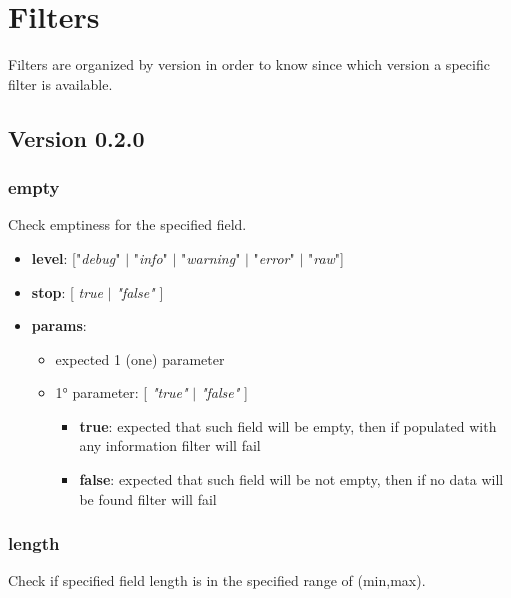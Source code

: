 \documentclass[12pt, a4paper]{book}
\begin{document}
\section{Filters}

Filters are organized by version in order to know since which version a specific filter is available.

\subsection{Version 0.2.0}

\subsubsection{empty}
\begin{justify}
Check emptiness for the specified field.
\end{justify}

\begin{itemize}
\item \textbf{level}: ["\textit{debug}" $|$ "\textit{info}" $|$ "\textit{warning}" $|$ "\textit{error}" $|$ "\textit{raw}"]
\item \textbf{stop}: [ \textit{true} $|$ \textit{"false"} ]
\item \textbf{params}: 
  \begin{itemize}
  \item expected 1 (one) parameter 
  \item 1° parameter: [ \textit{"true"} $|$ \textit{"false"} ]
    \begin{itemize}
    \item \textbf{true}: expected that such field will be empty, then if populated with any information filter will fail
    \item \textbf{false}: expected that such field will be not empty, then if no data will be found filter will fail
    \end{itemize}
  \end{itemize}
\end{itemize}


\subsubsection{length}
\begin{justify}
Check if specified field length is in the specified range of (min,max).
\end{justify}
\end{document}
